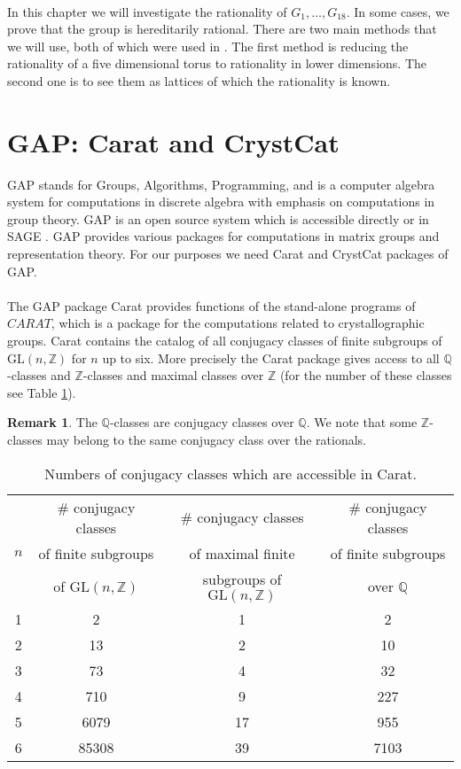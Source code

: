 \documentclass{article}
\theoremstyle{plain}
\theoremstyle{definition}
\newtheorem*{remark}{Remark}
\newcommand{\Z}{\ensuremath{\mathbb{Z}}}
\newcommand{\Q}{\ensuremath{\mathbb{Q}}}
\begin{document}
\\
In this chapter we will investigate the rationality of $G_1, \ldots ,  G_{18}$. In some cases, we prove that the group is hereditarily rational. There are two main methods that we will use, both of which were used in \cite{Nicole1}. The first method is reducing the rationality of a five dimensional torus to rationality in lower dimensions. The second one is to see them as lattices of which the rationality is known.

\section{GAP: Carat and CrystCat}
GAP \cite{GAP4} stands for Groups, Algorithms, Programming, and is a computer algebra system for computations in discrete algebra with emphasis on computations in group theory. GAP is an open source system which is accessible directly or in SAGE \cite{sagemath}. GAP provides various packages for computations in matrix groups and representation theory. For our purposes we need Carat and CrystCat packages of GAP.\\
\\
The GAP package Carat provides functions of the stand-alone programs of $CARAT$, which is a package for the computations related to crystallographic groups. Carat contains the catalog of all conjugacy classes of finite subgroups of $\mathrm{GL}(n,\Z)$ for $n$ up to six. More precisely the Carat package gives access to all $\Q$-classes and $\Z$-classes and maximal classes over $\Z$ (for the number of these classes see Table \ref{tbl:Carat}).  
\begin{remark}
The $\Q$-classes are conjugacy classes over $\Q$. We note that some $\Z$-classes may belong to the same conjugacy class over the rationals.
\end{remark}
\begin{table}[H]
\centering
\begin{tabular}{|c|c|c|c|}
\hline
 & \# conjugacy classes  & \# conjugacy classes & \# conjugacy classes \\
 $ n$ & of finite subgroups & of maximal finite  & of finite subgroups\\
		 &  of $\mathrm{GL}(n,\Z)$& subgroups of $\mathrm{GL}(n,\Z)$ & over $\Q$\\
 \hline
 1 & 2& 1 & 2\\
 2 & 13& 2 & 10\\
 3 & 73& 4 & 32\\ 
  4 & 710 & 9 & 227\\
  5 & 6079& 17 & 955\\
 6 & 85308& 39 & 7103\\
\hline
\end{tabular}
\caption{Numbers of conjugacy classes which are accessible in Carat.}
\label{tbl:Carat}
\end{table}
\end{document}

